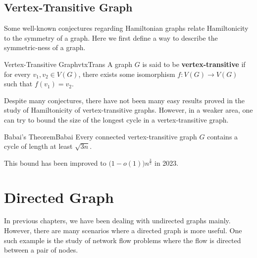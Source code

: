 \documentclass[math, code]{amznotes}
\theoremstyle{remark}
\begin{document}
\section{Vertex-Transitive Graph}
Some well-known conjectures regarding Hamiltonian graphs relate Hamiltonicity to the symmetry of a graph. Here we first define a way to describe the symmetric-ness of a graph.
\begin{dfnbox}{Vertex-Transitive Graph}{vtxTrans}
    A graph $G$ is said to be {\color{red} \textbf{vertex-transitive}} if for every $v_1, v_2 \in V(G)$, there exists some isomorphism $f \colon V(G) \to V(G)$ such that $f(v_1) = v_2$.
\end{dfnbox}
Despite many conjectures, there have not been many easy results proved in the study of Hamiltonicity of vertex-transitive graphs. However, in a weaker area, one can try to bound the size of the longest cycle in a vertex-transitive graph.
\begin{thmbox}{Babai's Theorem}{Babai}
    Every connected vertex-transitive graph $G$ contains a cycle of length at least $\sqrt{3n}$.
\end{thmbox}
This bound has been improved to $\bigl(1 - o(1)\bigr)n^{\frac{3}{5}}$ in 2023.
\chapter{Directed Graph}
In previous chapters, we have been dealing with undirected graphs mainly. However, there are many scenarios where a directed graph is more useful. One such example is the study of network flow problems where the flow is directed between a pair of nodes.
\end{document}
